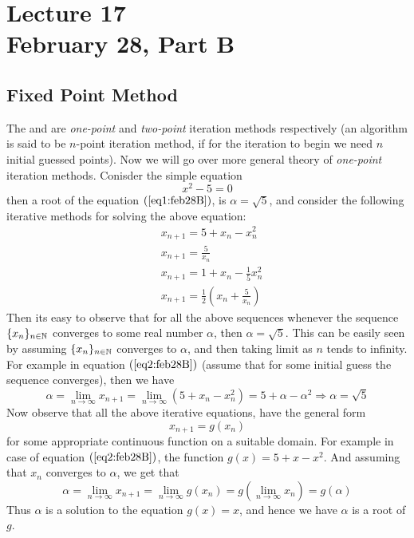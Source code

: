\chapter*{Lecture 17 \\ February 28, Part B}
\setcounter{chapter}{17}
\setcounter{section}{0}
\setcounter{equation}{0}
\setcounter{figure}{0}
\section{Fixed Point Method}

The  and  are \textit{one-point} and \textit{two-point} iteration methods respectively (an algorithm is said to be $n$-point iteration method, if for the iteration to begin we need $n$ initial guessed points). Now we will go over more general theory of \textit{one-point} iteration methods. Conisder the simple equation 
\begin{equation}\label{eq1:feb28B}
    x^2 - 5 = 0
\end{equation}
then a root of the equation $(\ref{eq1:feb28B})$, is $\alpha = \sqrt{5}$, and consider the following iterative methods for solving the above equation: 
\begin{align}\label{eq2:feb28B}
    &x_{n+1} = 5 + x_n - x_n^2 \\ 
    &x_{n+1} = \frac{5}{x_n} \\ 
    &x_{n+1} = 1 + x_n - \frac{1}{5}x_n^2 \\    
    &x_{n+1} = \frac{1}{2}\left(x_n + \frac{5}{x_n}\right)  
\end{align}
Then its easy to observe that for all the above sequences whenever the sequence $\{x_n\}_{n\in\mathbb{N}}$ converges to some real number $\alpha$, then $\alpha = \sqrt{5}$. This can be easily seen by assuming $\{x_n\}_{n \in \mathbb{N}}$ converges to $\alpha$, and then taking limit as $n$ tends to infinity. For example in equation $(\ref{eq2:feb28B})$ (assume that for some initial guess the sequence converges), then we have 
\[
   \alpha = \lim_{n\to\infty} x_{n+1} = \lim_{n\to\infty} \left( 5+x_n-x_n^2 \right) = 5 + \alpha - \alpha^2 \Rightarrow \alpha = \sqrt{5}  
\] 
Now observe that all the above iterative equations, have the general form 
\begin{equation}\label{eq3:feb28B}
    x_{n+1} = g(x_n)
\end{equation}
for some appropriate continuous function on a suitable domain. For example in case of equation $(\ref{eq2:feb28B})$, the function $g(x) = 5+x-x^2$. And assuming that $x_n$ converges to $\alpha$, we get that 
\[
    \alpha = \lim_{n\to\infty} x_{n+1} = \lim_{n\to\infty} g(x_n) = g \left( \lim_{n\to\infty} x_n \right) = g(\alpha)  
\]
Thus $\alpha$ is a solution to the equation $g(x)=x$, and hence we have $\alpha$ is a root of $g$.

